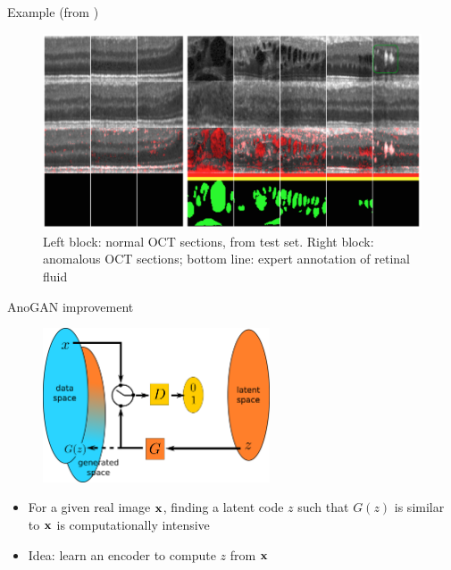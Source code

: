 \documentclass[xcolor=pdftex,dvipsnames,table,mathserif]{beamer}
\begin{document}
\begin{frame}{Example (from \cite{schlegl_unsupervised_2017})}


  \begin{figure}[ht]
    \centering
    \includegraphics[width=\textwidth]{res_oct}
    \caption*{Left block: normal OCT sections, from test set. Right block: anomalous OCT sections; bottom line: expert annotation of retinal fluid}
  \end{figure}

\end{frame}


\begin{frame}{AnoGAN improvement}

  \begin{figure}[ht]
    \centering
    \includegraphics[width=0.6\textwidth]{gan2}
  \end{figure}

  \begin{itemize}
  \item For a given real image $\mathbf{x}$, finding a latent code $z$ such that $G(z)$ is similar to $\mathbf{x}$ is computationally intensive
  \item Idea: learn an encoder to compute $z$ from $\mathbf{x}$
  \end{itemize}

\end{frame}
\end{document}

